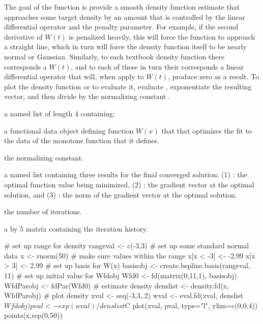 \begin{Details}\relax
The goal of the function is provide a smooth density function
estimate that approaches some target density by an amount that is
controlled by the linear differential operator  and
the penalty parameter. For example, if the second derivative of
$W(t)$ is penalized heavily, this will force the function to
approach a straight line, which in turn will force the density function
itself to be nearly normal or Gaussian.  Similarly, to each textbook
density function there corresponds a $W(t)$, and to each of these
in turn their corresponds a linear differential operator that will, when
apply to $W(t)$, produce zero as a result.
To plot the density function or to evaluate it, evaluate ,
exponentiate the resulting vector, and then divide by the normalizing
constant .
\end{Details}
\begin{Value}
a named list of length 4 containing:

\begin{ldescription}
\item[\code{Wfdobj}] a functional data object defining function $W(x)$ that that
optimizes the fit to the data of the monotone function that it defines.

\item[\code{C}] the normalizing constant.

\item[\code{Flist}] a named list containing three results for the final converged solution:
(1)
: the optimal function value being minimized,
(2)
: the gradient vector at the optimal solution,   and
(3)
: the norm of the gradient vector at the optimal solution.

\item[\code{iternum}] the number of iterations.

\item[\code{iterhist}] a  by 5 matrix containing the iteration
history.

\end{ldescription}
\end{Value}
\begin{SeeAlso}\relax
{}
\end{SeeAlso}
\begin{Examples}
\begin{ExampleCode}

#  set up range for density
rangeval <- c(-3,3)
#  set up some standard normal data
x <- rnorm(50)
#  make sure values within the range
x[x < -3] <- -2.99
x[x >  3] <-  2.99
#  set up basis for W(x)
basisobj <- create.bspline.basis(rangeval, 11)
#  set up initial value for Wfdobj
Wfd0 <- fd(matrix(0,11,1), basisobj)
WfdParobj <- fdPar(Wfd0)
#  estimate density
denslist <- density.fd(x, WfdParobj)
#  plot density
xval <- seq(-3,3,.2)
wval <- eval.fd(xval, denslist$Wfdobj)
pval <- exp(wval)/denslist$C
plot(xval, pval, type="l", ylim=c(0,0.4))
points(x,rep(0,50))

\end{ExampleCode}
\end{Examples}

